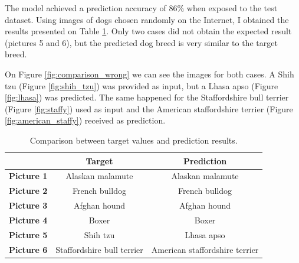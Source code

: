\documentclass{article}
\begin{document}
    The model achieved a prediction accuracy of 86\% when exposed to the test dataset. Using images of dogs chosen randomly on the Internet, I obtained the results presented on Table \ref*{tab:target_pred}. Only two cases did not obtain the expected result (pictures 5 and 6), but the predicted dog breed is very similar to the target breed.
    
    On Figure \ref*{fig:comparison_wrong} we can see the images for both cases. A Shih tzu (Figure \ref*{fig:shih_tzu}) was provided as input, but a Lhasa apso (Figure \ref*{fig:lhasa}) was predicted. The same happened for the Staffordshire bull terrier (Figure \ref*{fig:staffy}) used as input and the American staffordshire terrier (Figure \ref*{fig:american_staffy}) received as prediction.
    
    \begin{table}[htbp]
        \centering
        \begin{tabular}{c|c|c}
             & \textbf{Target} & \textbf{Prediction} \\
            \hline
            \textbf{Picture 1} & Alaskan malamute & Alaskan malamute \\
            \textbf{Picture 2} & French bulldog & French bulldog \\
            \textbf{Picture 3} & Afghan hound & Afghan hound \\
            \textbf{Picture 4} & Boxer & Boxer \\
            \textbf{Picture 5} & Shih tzu & Lhasa apso \\
            \textbf{Picture 6} & Staffordshire bull terrier & American staffordshire terrier \\
        \end{tabular}
        \caption{Comparison between target values and prediction results.}
        \label{tab:target_pred}
    \end{table}
\end{document}
